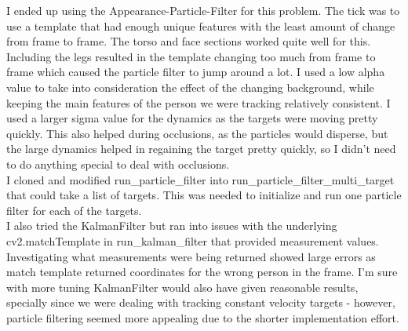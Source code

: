 
I ended up using the Appearance-Particle-Filter for this problem. The tick was to use a template that had enough unique features with the least amount of change from frame to frame. The torso and face sections worked quite well for this. Including the legs resulted in the template changing too much from frame to frame which caused the particle filter to jump around a lot. I used a low alpha value to take into consideration the effect of the changing background, while keeping the main features of the person we were tracking relatively consistent. I used a larger sigma value for the dynamics as the targets were moving pretty quickly. This also helped during occlusions, as the particles would disperse, but the large dynamics helped in regaining the target pretty quickly, so I didn't need to do anything special to deal with occlusions. \\
I cloned and modified run_particle_filter into run_particle_filter_multi_target that could take a list of targets. This was needed to initialize and run one particle filter for each of the targets. \\

I also tried the KalmanFilter but ran into issues with the underlying cv2.matchTemplate in run_kalman_filter that provided measurement values. Investigating what measurements were being returned showed large errors as match template returned coordinates for the wrong person in the frame. I'm sure with more tuning KalmanFilter would also have given reasonable results, specially since we were dealing with tracking constant velocity targets - however, particle filtering seemed more appealing due to the shorter implementation effort. \\
